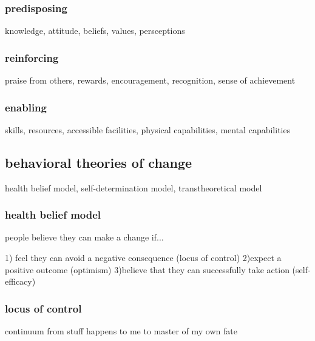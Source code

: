 \documentclass[letterpaper]{article}
\begin{document}
\subsubsection*{predisposing}
knowledge, attitude, beliefs, values, persceptions
\subsubsection*{reinforcing}
praise from others, rewards, encouragement, recognition, sense of achievement
\subsubsection*{enabling}
skills, resources, accessible facilities, physical capabilities, mental capabilities
\subsection*{behavioral theories of change}
health belief model, self-determination model, transtheoretical model
\subsubsection*{health belief model}
people believe they can make a change if...

1) feel they can avoid a negative consequence (locus of control)
2)expect a positive outcome (optimism)
3)believe that they can successfully take action (self-efficacy)

\subsubsection*{locus of control}
continuum from stuff happens to me to master of my own fate
\end{document}
